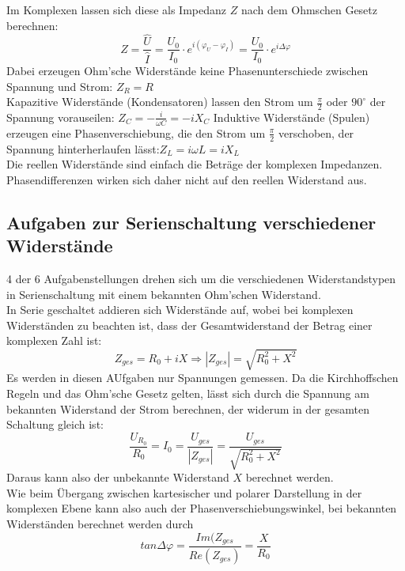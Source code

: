 \documentclass[12pt,a4paper]{article}
\begin{document}
\begin{multicols}{2}
Im Komplexen lassen sich diese als Impedanz $Z$ nach dem Ohmschen Gesetz berechnen:
$$Z=\frac{\hat{U}}{\hat{I}}=\frac{U_0}{I_0}\cdot e^{i(\varphi_U - \varphi_I)}=\frac{U_0}{I_0}\cdot e^{i \Delta \varphi}$$
Dabei erzeugen Ohm'sche Widerstände keine Phasenunterschiede zwischen Spannung und Strom: $Z_R = R$\\
Kapazitive Widerstände (Kondensatoren) lassen den Strom um $\frac{\pi}{2}$ oder $90^\circ$ der Spannung vorauseilen: $Z_C=-\frac{i}{\omega C}=-i X_C$
Induktive Widerstände (Spulen) erzeugen eine Phasenverschiebung, die den Strom um  $\frac{\pi}{2}$ verschoben, der Spannung hinterherlaufen lässt:$Z_L=i \omega L = i X_L$\\
Die reellen Widerstände sind einfach die  Beträge der komplexen Impedanzen. Phasendifferenzen wirken sich daher nicht auf den reellen Widerstand aus.

\subsection{Aufgaben zur Serienschaltung verschiedener Widerstände}
4 der 6 Aufgabenstellungen drehen sich um die verschiedenen Widerstandstypen in Serienschaltung mit einem bekannten Ohm'schen Widerstand.\\
In Serie geschaltet addieren sich Widerstände auf, wobei bei komplexen Widerständen zu beachten ist, dass der Gesamtwiderstand der Betrag einer komplexen Zahl ist:
$$Z_{ges}=R_0 + iX \Rightarrow |Z_{ges}|=\sqrt{R_0^2+X^2}$$
Es werden in diesen AUfgaben nur Spannungen gemessen. Da die Kirchhoffschen Regeln und das Ohm'sche Gesetz gelten, lässt sich durch die Spannung am bekannten Widerstand der Strom berechnen, der widerum in der gesamten Schaltung gleich ist:
$$\frac{U_{R_0}}{R_0}=I_0=\frac{U_{ges}}{|Z_{ges}|}=\frac{U_{ges}}{\sqrt{R_0^2+X^2}}$$
Daraus kann also der unbekannte Widerstand $X$ berechnet werden.\\
Wie beim Übergang zwischen kartesischer und polarer Darstellung in der komplexen Ebene kann also auch der Phasenverschiebungswinkel, bei bekannten Widerständen berechnet werden durch
$$tan{\Delta \varphi}=\frac{Im(Z_{ges}}{Re(Z_{ges})}=\frac{X}{R_0}$$


\end{multicols}
\end{document}
